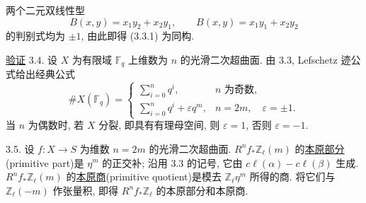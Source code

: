两个二元双线性型
\begin{equation*}
B(x,y)=x_1y_2+x_2y_1,
\qquad
B(x,y)=x_1y_1+x_2y_2
\end{equation*}
的判别式均为 $\pm1$, 由此即得 (3.3.1) 为同构.


\underline{验证} 3.4. 设 $X$ 为有限域 $\mathbb F_q$ 上维数为 $n$ 的光滑二次超曲面. 由 3.3, Lefschetz 迹公式给出经典公式
\begin{equation*}
\#X(\mathbb F_q)=
\begin{cases}
\displaystyle\sum_{i=0}^{n}q^i,
  & n\text{ 为奇数},\\[2ex]
\displaystyle\sum_{i=0}^{n}q^i+\varepsilon q^m,
  & n=2m,\quad \varepsilon=\pm1.
\end{cases}
\end{equation*}
当 $n$ 为偶数时, 若 $X$ 分裂, 即具有有理母空间, 则 $\varepsilon=1$, 否则 $\varepsilon=-1$.

3.5. 设 $f:X\longrightarrow S$ 为维数 $n=2m$ 的光滑二次超曲面. $R^nf_*\mathbb Z_\ell(m)$ 的\underline{本原部分}(primitive part)是 $\eta^m$ 的正交补; 沿用 3.3 的记号, 它由 $c\ell(\alpha)-c\ell(\beta)$ 生成. $R^nf_*\mathbb Z_\ell(m)$ 的\underline{本原商}(primitive quotient)是模去 $\mathbb Z_\ell\eta^m$ 所得的商. 将它们与 $\mathbb Z_\ell(-m)$ 作张量积, 即得 $R^nf_*\mathbb Z_\ell$ 的本原部分和本原商.

